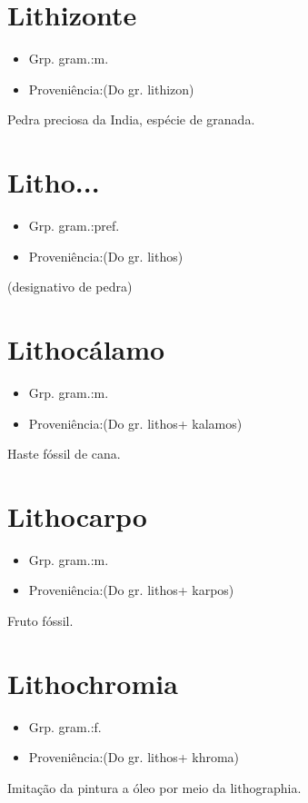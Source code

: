 \section{Lithizonte}
\begin{itemize}
\item {Grp. gram.:m.}
\end{itemize}
\begin{itemize}
\item {Proveniência:(Do gr. \textunderscore lithizon\textunderscore )}
\end{itemize}
Pedra preciosa da India, espécie de granada.
\section{Litho...}
\begin{itemize}
\item {Grp. gram.:pref.}
\end{itemize}
\begin{itemize}
\item {Proveniência:(Do gr. \textunderscore lithos\textunderscore )}
\end{itemize}
(designativo de \textunderscore pedra\textunderscore )
\section{Lithocálamo}
\begin{itemize}
\item {Grp. gram.:m.}
\end{itemize}
\begin{itemize}
\item {Proveniência:(Do gr. \textunderscore lithos\textunderscore  + \textunderscore kalamos\textunderscore )}
\end{itemize}
Haste fóssil de cana.
\section{Lithocarpo}
\begin{itemize}
\item {Grp. gram.:m.}
\end{itemize}
\begin{itemize}
\item {Proveniência:(Do gr. \textunderscore lithos\textunderscore  + \textunderscore karpos\textunderscore )}
\end{itemize}
Fruto fóssil.
\section{Lithochromia}
\begin{itemize}
\item {Grp. gram.:f.}
\end{itemize}
\begin{itemize}
\item {Proveniência:(Do gr. \textunderscore lithos\textunderscore  + \textunderscore khroma\textunderscore )}
\end{itemize}
Imitação da pintura a óleo por meio da lithographia.
